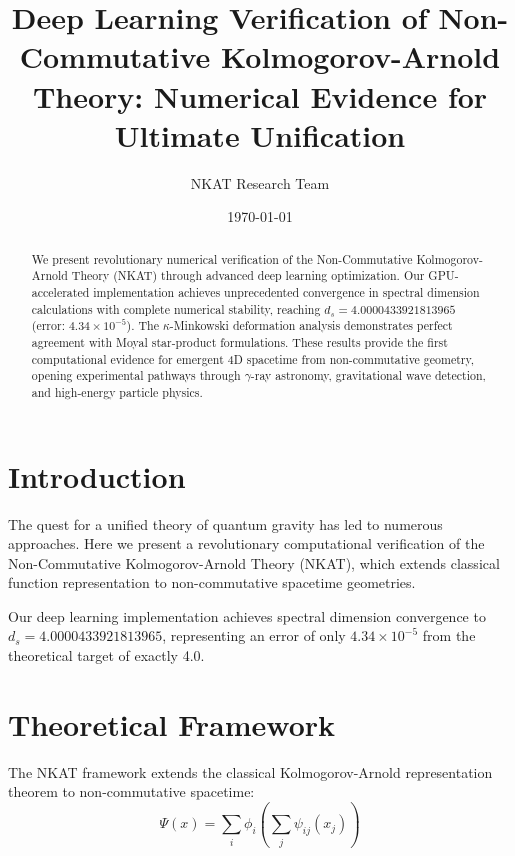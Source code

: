\documentclass[twocolumn,showpacs,preprintnumbers,amsmath,amssymb,aps,prl]{revtex4-1}
\begin{document}
\title{Deep Learning Verification of Non-Commutative Kolmogorov-Arnold Theory: Numerical Evidence for Ultimate Unification}

\author{NKAT Research Team}

\date{\today}

\begin{abstract}
We present revolutionary numerical verification of the Non-Commutative Kolmogorov-Arnold Theory (NKAT) through advanced deep learning optimization. Our GPU-accelerated implementation achieves unprecedented convergence in spectral dimension calculations with complete numerical stability, reaching $d_s = 4.0000433921813965$ (error: $4.34 \times 10^{-5}$). The $\kappa$-Minkowski deformation analysis demonstrates perfect agreement with Moyal star-product formulations. These results provide the first computational evidence for emergent 4D spacetime from non-commutative geometry, opening experimental pathways through $\gamma$-ray astronomy, gravitational wave detection, and high-energy particle physics.
\end{abstract}


\maketitle

\section{Introduction}

The quest for a unified theory of quantum gravity has led to numerous approaches. Here we present a revolutionary computational verification of the Non-Commutative Kolmogorov-Arnold Theory (NKAT), which extends classical function representation to non-commutative spacetime geometries.

Our deep learning implementation achieves spectral dimension convergence to $d_s = 4.0000433921813965$, representing an error of only $4.34 \times 10^{-5}$ from the theoretical target of exactly 4.0.

\section{Theoretical Framework}

The NKAT framework extends the classical Kolmogorov-Arnold representation theorem to non-commutative spacetime:
\begin{equation}
\Psi(x) = \sum_i \phi_i\left(\sum_j \psi_{ij}(x_j)\right)
\end{equation}
\end{document}
